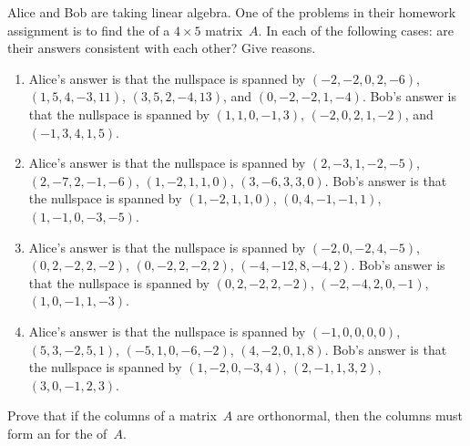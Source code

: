 \begin{exercise}  
Alice and Bob are taking linear algebra. 
One of the problems in their homework assignment is to find the  of a \(4\times5\) matrix~\(A\). 
In each of the following cases: are their answers consistent with each other?
Give reasons.
\begin{enumerate} \sloppy
\item Alice's answer is that the nullspace is spanned by 
\((-2, -2, 0, 2, -6)\), \((1, 5, 4, -3, 11)\), \((3, 5, 2, -4, 13)\), and \((0, -2, -2, 1, -4)\). 
Bob's answer is that the nullspace is spanned by 
\((1, 1, 0, -1, 3)\), \((-2, 0, 2, 1, -2)\), and \((-1, 3, 4, 1, 5)\).%

\item Alice's answer is that the nullspace is spanned by 
\((2,-3,1,-2,-5)\), 
\((2,-7,2,-1,-6)\), 
\((1,-2,1,1,0)\), 
\((3,-6,3,3,0)\). 
Bob's answer is that the nullspace is spanned by 
\((1,-2,1,1,0)\), 
\((0,4,-1,-1,1)\), 
\((1,-1,0,-3,-5)\).%

\item Alice's answer is that the nullspace is spanned by 
\((-2,0,-2,4,-5)\), 
\((0,2,-2,2,-2)\), 
\((0,-2,2,-2,2)\), 
\((-4,-12,8,-4,2)\). 
Bob's answer is that the nullspace is spanned by 
\((0,2,-2,2,-2)\), 
\((-2,-4,2,0,-1)\), 
\((1,0,-1,1,-3)\).%

\item Alice's answer is that the nullspace is spanned by 
\((-1,0,0,0,0)\), 
\((5,3,-2,5,1)\), 
\((-5,1,0,-6,-2)\), 
\((4,-2,0,1,8)\). 
Bob's answer is that the nullspace is spanned by 
\((1,-2,0,-3,4)\), 
\((2,-1,1,3,2)\), 
\((3,0,-1,2,3)\).%

\end{enumerate}
\end{exercise}










\begin{exercise}  
Prove that if the columns of a matrix~\(A\) are orthonormal, then the columns must form an  for the  of~\(A\).
\end{exercise}




